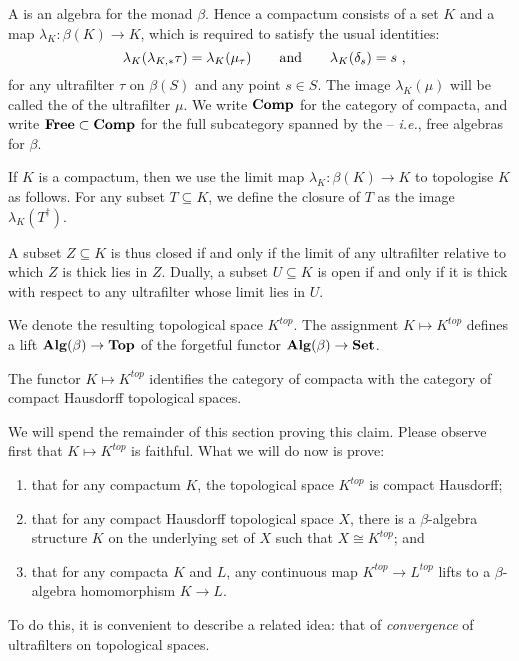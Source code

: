 \begin{dfn} \label{compactaasbetaalgebras}
	A  is an algebra for the monad $ \beta $.
	Hence a compactum consists of a set $ K $ and a map $ \lambda_K \colon \beta(K) \to K $, which is required to satisfy the usual identities:
	\[
		\lambda_K(\lambda_{K,\ast}\tau) = \lambda_K(\mu_{\tau}) \andeq{} \lambda_K(\delta_s) = s \comma
	\]
	for any ultrafilter $ \tau $ on $ \beta(S) $ and any point $ s \in S $.
	The image $ \lambda_K(\mu) $ will be called the  of the ultrafilter $\mu$.
	We write $ \textbf{\textup{Comp}} $ for the category of compacta, and write $\textbf{\textup{Free}} \subset \textbf{\textup{Comp}} $ for the full subcategory spanned by the  -- \emph{i.e.}, free algebras for $ \beta $.
\end{dfn}

\begin{cnstr} \label{turnacompactumintoatopspace}
	If $K$ is a compactum, then we use the limit map $ \lambda_K \colon \beta(K) \to K $ to topologise $ K $ as follows.
	For any subset $ T \subseteq K $, we define the closure of $ T $ as the image $ \lambda_K(T^{\dag}) $.

	A subset $ Z \subseteq K $ is thus closed if and only if the limit of any ultrafilter relative to which $ Z $ is thick lies in $ Z $.
	Dually, a subset $ U \subseteq K $ is open if and only if it is thick with respect to any ultrafilter whose limit lies in $ U $.

	We denote the resulting topological space $ K^{\textit{top}} $.
	The assignment $ K \mapsto K^{\textit{top}} $ defines a lift $ \textbf{\textup{Alg}}(\beta) \to \textbf{\textup{Top}} $ of the forgetful functor $ \textbf{\textup{Alg}}(\beta) \to \textbf{\textup{Set}} $.
\end{cnstr}

\begin{prp} \label{compactaarecompacta}
	The functor $ K \mapsto K^{\textit{top}} $ identifies the category of compacta with the category of compact Hausdorff topological spaces. 
\end{prp}

We will spend the remainder of this section proving this claim.
Please observe first that $ K \mapsto K^{\textit{top}} $ is faithful.
What we will do now is prove:
\begin{enumerate}[(1)]
	\item that for any compactum $ K $, the topological space $ K^{\textit{top}} $ is compact Hausdorff;
	\item that for any compact Hausdorff topological space $ X $, there is a $ \beta $-algebra structure $ K $ on the underlying set of $ X $ such that $ X \cong K^{\textit{top}} $; and
	\item that for any compacta $ K $ and $ L $, any continuous map $ K^{\textit{top}} \to L^{\textit{top}} $ lifts to a $ \beta $-algebra homomorphism $ K \to L$.
\end{enumerate}
To do this, it is convenient to describe a related idea: that of \emph{convergence} of ultrafilters on topological spaces.

